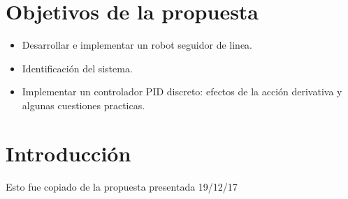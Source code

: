 \documentclass[10pt,conference,a4paper,onecolumn]{article}%
\begin{document}
\section{Objetivos de la propuesta}

\begin{itemize}
\item Desarrollar e implementar un robot seguidor de linea.
\item Identificación del sistema.
\item Implementar un controlador PID discreto: efectos de la acción derivativa y algunas cuestiones practicas.

\end{itemize}
\section{Introducción}
Esto fue copiado de la propuesta presentada 19/12/17
\end{document}
